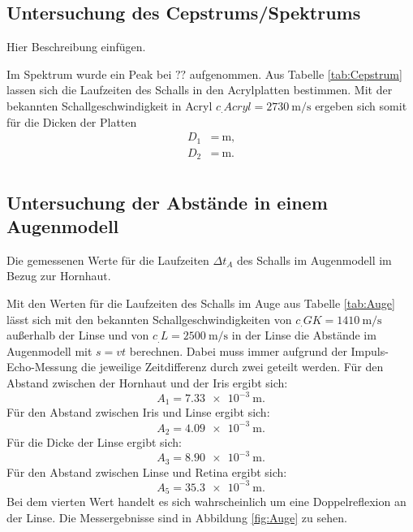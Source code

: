 \subsection{Untersuchung des Cepstrums/Spektrums}

\begin{table}
	\centering
	\caption{Hier Beschreibung einfügen.}
	\label{tab:Cepstrum}
\end{table}

\noindent Im Spektrum wurde ein Peak bei $??$ aufgenommen.
Aus Tabelle \ref{tab:Cepstrum} lassen sich die Laufzeiten des Schalls in den Acrylplatten bestimmen.
Mit der bekannten Schallgeschwindigkeit in Acryl $c_.{Acryl}=\SI{2730}{\meter\per\second}$ \cite{cAcryl} ergeben sich somit für die Dicken der Platten
\begin{align*}
D_1&=\SI{}{\meter}\text{,}\\
D_2&=\SI{}{\meter}\text{.}\\
\end{align*}

\subsection{Untersuchung der Abstände in einem Augenmodell}

\begin{table}
	\centering
	\caption{Die gemessenen Werte für die Laufzeiten $\Delta t_A$ des Schalls im Augenmodell im Bezug zur Hornhaut.}
	
	\label{tab:Auge}
\end{table}

\noindent Mit den Werten für die Laufzeiten des Schalls im Auge aus Tabelle \ref{tab:Auge} lässt sich mit den bekannten Schallgeschwindigkeiten von $c_.{GK}=\SI{1410}{\meter\per\second}$ \cite{US1} außerhalb der Linse und von $c_.{L}=\SI{2500}{\meter\per\second}$ \cite{US1} in der Linse die Abstände im Augenmodell mit $s=vt$ berechnen. Dabei muss immer aufgrund der Impuls-Echo-Messung die jeweilige Zeitdifferenz durch zwei geteilt werden. Für den Abstand zwischen der Hornhaut und der Iris ergibt sich:
\begin{equation*}
A_1=\SI{7.33e-3}{\meter}\text{.}
\end{equation*}
Für den Abstand zwischen Iris und Linse ergibt sich:
\begin{equation*}
A_2=\SI{4.09e-3}{\meter}\text{.}
\end{equation*}
Für die Dicke der Linse ergibt sich:
\begin{equation*}
A_3=\SI{8.90e-3}{\meter}\text{.}
\end{equation*}
Für den Abstand zwischen Linse und Retina ergibt sich:
\begin{equation*}
A_5=\SI{35,3e-3}{\meter}\text{.}
\end{equation*}
Bei dem vierten Wert handelt es sich wahrscheinlich um eine Doppelreflexion an der Linse.
Die Messergebnisse sind in Abbildung \ref{fig:Auge} zu sehen.


